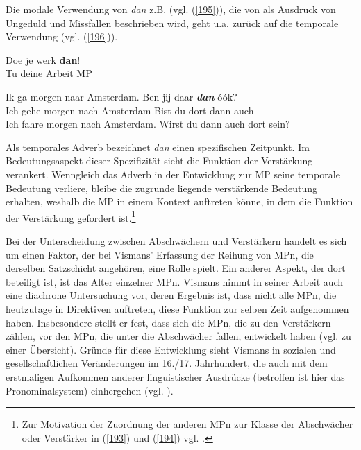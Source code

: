 Die modale Verwendung von \textit{dan} z.B. (vgl. (\ref{195})), die von \citet[605]{Dale1992} als Ausdruck von Ungeduld und Missfallen beschrieben wird, geht u.a. zurück auf die temporale Verwendung (vgl. (\ref{196})).

\begin{exe}
	\ex\label{195} 
	\gll Doe je werk \textbf{dan}!\\
	Tu deine Arbeit MP\\
\end{exe}

\begin{exe}
	\ex\label{196} 
	\gll Ik ga morgen naar Amsterdam. Ben jij daar \textbf{\textit{dan}} óók?\\
	Ich gehe morgen nach Amsterdam Bist du dort dann auch\\
	\glt Ich fahre morgen nach Amsterdam. Wirst du dann auch dort sein?
	\newline
	\hbox{}\hfill\hbox {\citet[62/61]{Vismans1994}}
\end{exe}	
Als temporales Adverb bezeichnet \textit{dan} einen spezifischen Zeitpunkt. Im Bedeutungsaspekt dieser Spezifizität sieht \citet[58-60]{Vismans1994} die Funktion der Verstärkung verankert. Wenngleich das Adverb in der Entwicklung zur MP seine temporale Bedeutung verliere, bleibe die zugrunde liegende verstärkende Bedeutung erhalten, weshalb die MP in einem Kontext auftreten könne, in dem die Funktion der Verstärkung gefordert ist.\footnote{Zur Motivation der Zuordnung der anderen MPn zur Klasse der Abschwächer oder Verstärker in (\ref{193}) und (\ref{194}) vgl. \citet[61-73]{Vismans1994}.}

Bei der Unterscheidung zwischen Abschwächern und Verstärkern handelt es sich um einen Faktor, der bei Vismans' Erfassung der Reihung von MPn, die derselben Satzschicht angehören, eine Rolle spielt. Ein anderer Aspekt, der dort beteiligt ist, ist das Alter einzelner MPn. Vismans nimmt in seiner Arbeit auch eine diachrone Untersuchung  vor, deren Ergebnis ist, dass nicht alle MPn, die heutzutage in Direktiven  auftreten, diese Funktion zur selben Zeit aufgenommen haben. Insbesondere stellt er fest, dass sich die MPn, die zu den Verstärkern zählen, vor den MPn, die unter die Abschwächer fallen, entwickelt haben (vgl. \citeyear[103]{Vismans1994} zu einer Übersicht). Gründe für diese Entwicklung sieht Vismans in sozialen und gesellschaftlichen Veränderungen im 16./17. Jahrhundert, die auch mit dem erstmaligen Aufkommen anderer linguistischer Ausdrücke (betroffen ist hier das Pronominalsystem) einhergehen (vgl. \citealt[102-106]{Vismans1994}).

